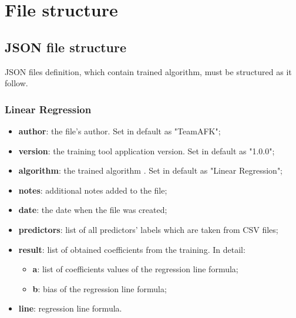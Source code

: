 \section{File structure}
	\subsection{JSON file structure}
JSON files definition, which contain trained algorithm, must be structured as it follow.	

		\subsubsection{Linear Regression}
		\begin{itemize}
			\item\textbf{author}: the file's author. Set in default as "TeamAFK";
			\item\textbf{version}: the training tool application version. Set in default as "1.0.0";
			\item\textbf{algorithm}: the trained algorithm . Set in default as "Linear Regression"; 	
			\item\textbf{notes}: additional notes added to the file;
			\item\textbf{date}: the date when the file was created;
			\item\textbf{predictors}: list of all predictors' labels which are taken from CSV files;
			\item\textbf{result}: list of obtained coefficients from the training. In detail:
			\begin{itemize}
					\item\textbf{a}: list of coefficients values of the regression line formula;
					\item\textbf{b}: bias of the regression line formula;
				\end{itemize}
			\item\textbf{line}: regression line formula.
					
		\end{itemize}
		
